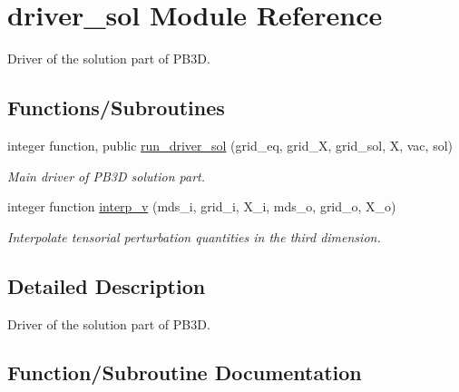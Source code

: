 \hypertarget{namespacedriver__sol}{}\section{driver\+\_\+sol Module Reference}
\label{namespacedriver__sol}


Driver of the solution part of P\+B3D.  


\subsection*{Functions/\+Subroutines}
\begin{DoxyCompactItemize}
\item 
integer function, public \hyperlink{namespacedriver__sol_ad3b1765b3ecc5f82129bfc683ffc6c5c}{run\+\_\+driver\+\_\+sol} (grid\+\_\+eq, grid\+\_\+X, grid\+\_\+sol, X, vac, sol)
\begin{DoxyCompactList}\small\item\em Main driver of P\+B3D solution part. \end{DoxyCompactList}\item 
integer function \hyperlink{namespacedriver__sol_af1c4ea0286ad714d3f91bb1608e4fc27}{interp\+\_\+v} (mds\+\_\+i, grid\+\_\+i, X\+\_\+i, mds\+\_\+o, grid\+\_\+o, X\+\_\+o)
\begin{DoxyCompactList}\small\item\em Interpolate tensorial perturbation quantities in the third dimension. \end{DoxyCompactList}\end{DoxyCompactItemize}


\subsection{Detailed Description}
Driver of the solution part of P\+B3D. 

\subsection{Function/\+Subroutine Documentation}
\mbox{\label{namespacedriver__sol_af1c4ea0286ad714d3f91bb1608e4fc27}} 
